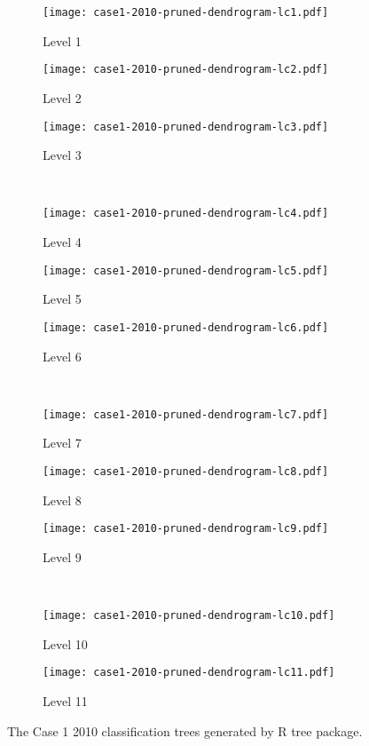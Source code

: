\begin{appendices}

\begin{figure}[!ht] \centering
	\captionsetup[subfigure]{width=2.0in}
	\begin{subfigure}[t]{0.32\textwidth}
		\texttt{[image: case1-2010-pruned-dendrogram-lc1.pdf]}
		\caption{Level 1}
	\end{subfigure}
	\begin{subfigure}[t]{0.32\textwidth}
		\texttt{[image: case1-2010-pruned-dendrogram-lc2.pdf]}
		\caption{Level 2}
	\end{subfigure}
	\begin{subfigure}[t]{0.32\textwidth}
		\texttt{[image: case1-2010-pruned-dendrogram-lc3.pdf]}
		\caption{Level 3}
	\end{subfigure}\\
	\vspace{5pt}
	\begin{subfigure}[t]{0.32\textwidth}
		\texttt{[image: case1-2010-pruned-dendrogram-lc4.pdf]}
		\caption{Level 4}
	\end{subfigure}
	\begin{subfigure}[t]{0.32\textwidth}
		\texttt{[image: case1-2010-pruned-dendrogram-lc5.pdf]}
		\caption{Level 5}
	\end{subfigure}
	\begin{subfigure}[t]{0.32\textwidth}
		\texttt{[image: case1-2010-pruned-dendrogram-lc6.pdf]}
		\caption{Level 6}
	\end{subfigure}\\
	\vspace{5pt}	
	\begin{subfigure}[t]{0.32\textwidth}
		\texttt{[image: case1-2010-pruned-dendrogram-lc7.pdf]}
		\caption{Level 7}
	\end{subfigure}
	\begin{subfigure}[t]{0.32\textwidth}
		\texttt{[image: case1-2010-pruned-dendrogram-lc8.pdf]}
		\caption{Level 8}
	\end{subfigure}
	\begin{subfigure}[t]{0.32\textwidth}
		\texttt{[image: case1-2010-pruned-dendrogram-lc9.pdf]}
		\caption{Level 9}
	\end{subfigure}\\
	\vspace{5pt}
	\begin{subfigure}[t]{0.32\textwidth}
		\texttt{[image: case1-2010-pruned-dendrogram-lc10.pdf]}
		\caption{Level 10}
	\end{subfigure}
	\begin{subfigure}[t]{0.32\textwidth}
		\texttt{[image: case1-2010-pruned-dendrogram-lc11.pdf]}
		\caption{Level 11}
	\end{subfigure}
	\vspace{5pt}
	\caption[The Case 1 2010 classification trees generated by R tree package.]{The Case 1 2010 classification trees generated by R tree package.}
	\label{fig: appendix-fig.c7.tree}
\end{figure}


\end{appendices}
